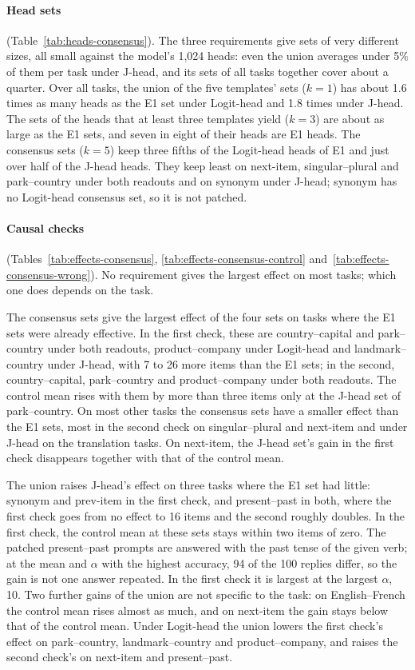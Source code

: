 \documentclass[11pt,a4paper]{article}
\begin{document}
\paragraph{Head sets} (Table~\ref{tab:heads-consensus}). The three requirements give sets of very different sizes, all small against the model's 1,024 heads: even the union averages under 5\% of them per task under J-head, and its sets of all tasks together cover about a quarter. Over all tasks, the union of the five templates' sets ($k=1$) has about 1.6 times as many heads as the E1 set under Logit-head and 1.8 times under J-head. The sets of the heads that at least three templates yield ($k=3$) are about as large as the E1 sets, and seven in eight of their heads are E1 heads. The consensus sets ($k=5$) keep three fifths of the Logit-head heads of E1 and just over half of the J-head heads. They keep least on next-item, singular--plural and park--country under both readouts and on synonym under J-head; synonym has no Logit-head consensus set, so it is not patched.

\paragraph{Causal checks} (Tables~\ref{tab:effects-consensus}, \ref{tab:effects-consensus-control} and~\ref{tab:effects-consensus-wrong}). No requirement gives the largest effect on most tasks; which one does depends on the task.

The consensus sets give the largest effect of the four sets on tasks where the E1 sets were already effective. In the first check, these are country--capital and park--country under both readouts, product--company under Logit-head and landmark--country under J-head, with 7 to 26 more items than the E1 sets; in the second, country--capital, park--country and product--company under both readouts. The control mean rises with them by more than three items only at the J-head set of park--country. On most other tasks the consensus sets have a smaller effect than the E1 sets, most in the second check on singular--plural and next-item and under J-head on the translation tasks. On next-item, the J-head set's gain in the first check disappears together with that of the control mean.

The union raises J-head's effect on three tasks where the E1 set had little: synonym and prev-item in the first check, and present--past in both, where the first check goes from no effect to 16 items and the second roughly doubles. In the first check, the control mean at these sets stays within two items of zero. The patched present--past prompts are answered with the past tense of the given verb; at the mean and $\alpha$ with the highest accuracy, 94 of the 100 replies differ, so the gain is not one answer repeated. In the first check it is largest at the largest $\alpha$, 10. Two further gains of the union are not specific to the task: on English--French the control mean rises almost as much, and on next-item the gain stays below that of the control mean. Under Logit-head the union lowers the first check's effect on park--country, landmark--country and product--company, and raises the second check's on next-item and present--past.
\end{document}
